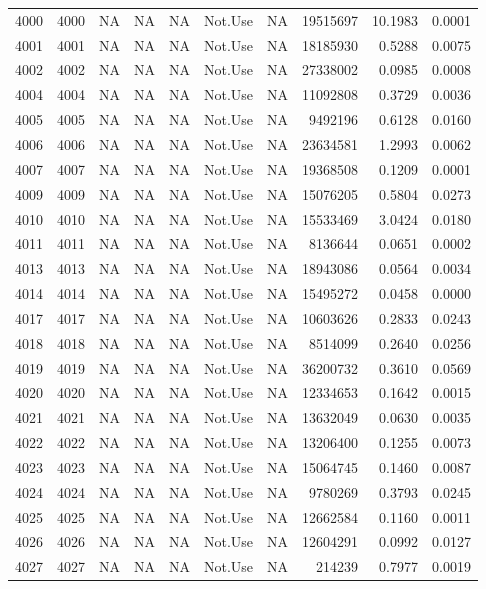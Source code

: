 {\begin{longtable}{ | r | r | r | r | r | r | r | r | r | r | }
 
4000 & 4000 & NA & NA & NA & Not.Use & NA & 19515697 & 10.1983 & 0.0001\\ 
4001 & 4001 & NA & NA & NA & Not.Use & NA & 18185930 & 0.5288 & 0.0075\\ 
4002 & 4002 & NA & NA & NA & Not.Use & NA & 27338002 & 0.0985 & 0.0008\\ 
4004 & 4004 & NA & NA & NA & Not.Use & NA & 11092808 & 0.3729 & 0.0036\\ 
4005 & 4005 & NA & NA & NA & Not.Use & NA & 9492196 & 0.6128 & 0.0160\\ 
4006 & 4006 & NA & NA & NA & Not.Use & NA & 23634581 & 1.2993 & 0.0062\\ 
4007 & 4007 & NA & NA & NA & Not.Use & NA & 19368508 & 0.1209 & 0.0001\\ 
4009 & 4009 & NA & NA & NA & Not.Use & NA & 15076205 & 0.5804 & 0.0273\\ 
4010 & 4010 & NA & NA & NA & Not.Use & NA & 15533469 & 3.0424 & 0.0180\\ 
4011 & 4011 & NA & NA & NA & Not.Use & NA & 8136644 & 0.0651 & 0.0002\\ 
4013 & 4013 & NA & NA & NA & Not.Use & NA & 18943086 & 0.0564 & 0.0034\\ 
4014 & 4014 & NA & NA & NA & Not.Use & NA & 15495272 & 0.0458 & 0.0000\\ 
4017 & 4017 & NA & NA & NA & Not.Use & NA & 10603626 & 0.2833 & 0.0243\\ 
4018 & 4018 & NA & NA & NA & Not.Use & NA & 8514099 & 0.2640 & 0.0256\\ 
4019 & 4019 & NA & NA & NA & Not.Use & NA & 36200732 & 0.3610 & 0.0569\\ 
4020 & 4020 & NA & NA & NA & Not.Use & NA & 12334653 & 0.1642 & 0.0015\\ 
4021 & 4021 & NA & NA & NA & Not.Use & NA & 13632049 & 0.0630 & 0.0035\\ 
4022 & 4022 & NA & NA & NA & Not.Use & NA & 13206400 & 0.1255 & 0.0073\\ 
4023 & 4023 & NA & NA & NA & Not.Use & NA & 15064745 & 0.1460 & 0.0087\\ 
4024 & 4024 & NA & NA & NA & Not.Use & NA & 9780269 & 0.3793 & 0.0245\\ 
4025 & 4025 & NA & NA & NA & Not.Use & NA & 12662584 & 0.1160 & 0.0011\\ 
4026 & 4026 & NA & NA & NA & Not.Use & NA & 12604291 & 0.0992 & 0.0127\\ 
4027 & 4027 & NA & NA & NA & Not.Use & NA & 214239 & 0.7977 & 0.0019\\ 

\end{longtable}}
